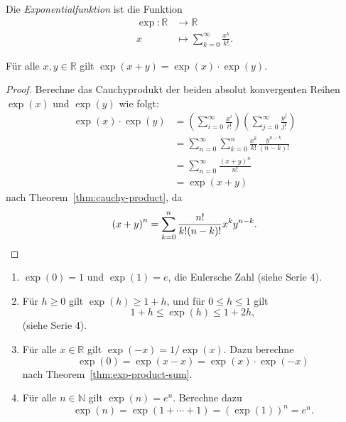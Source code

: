 \documentclass[../main.tex]{subfiles}
\begin{document}
\begin{definition}
  Die \emph{Exponentialfunktion} ist die Funktion
  \begin{align*}
    \exp \colon \mathbb{R} & \to \mathbb{R} \\
    x & \mapsto \sum_{k=0}^{\infty} \frac{x^k}{k!}.
  \end{align*}
\end{definition}

\begin{theorem}\label{thm:exp-product-sum}
  Für alle $x, y \in \mathbb{R}$ gilt
  \(
    \exp(x + y) = \exp (x) \cdot \exp (y).
  \)
\end{theorem}

\begin{proof}
  Berechne das Cauchyprodukt
  der beiden absolut konvergenten Reihen
  $\exp(x)$ und $\exp(y)$ wie folgt:
  \begin{align*}
    \exp(x) \cdot \exp(y) & =
    \left(\sum_{i=0}^{\infty} \frac{x^i}{i!}\right)
    \left( \sum_{j=0}^{\infty} \frac{y^j}{j!} \right)\\ &
    = \sum_{n=0}^{\infty} \sum_{k=0}^{n} \frac{x^k}{k!} 
    \frac{y^{n-k}}{(n-k)!} \\ &
    = \sum_{n=0}^{\infty} \frac{{(x + y)}^n}{n!} \\&
    = \exp(x + y)
  \end{align*}
  nach Theorem~\ref{thm:cauchy-product},
  da
  \[
    {(x + y)}^n = \sum_{k=0}^{n} \frac{n!}{k! {(n-k)}!} x^k y^{n-k}.
    \qedhere
  \]
\end{proof}

\begin{eig-exp}
  \leavevmode
  \begin{enumerate}[\normalfont(i)]
    \item $\exp(0) = 1$ und $\exp(1) = e$, die Eulersche Zahl
      (siehe Serie 4).
    \item Für $h \geq 0$ gilt $\exp(h) \geq 1 + h$,
      und für $0 \leq h \leq 1$ gilt  
      \[
        1 + h \leq \exp(h) \leq 1 + 2h,
      \]
      (siehe Serie 4). %
    \item Für alle $x \in \mathbb{R}$ gilt
      \(
        \exp(-x) = {1}/{\exp(x)}.
      \)
      Dazu berechne
      \[
        \exp(0) = \exp(x - x) = \exp(x) \cdot \exp(-x)
      \]
      nach Theorem~\ref{thm:exp-product-sum}.
    \item Für alle
      $n \in \mathbb{N}$ gilt $\exp(n) = e^n$. Berechne dazu
      \[
        \exp(n) = \exp(1 + \cdots + 1) =
        {\left( \exp(1) \right)}^n = e^n.
      \]
  \end{enumerate}
\end{eig-exp}
\end{document}
